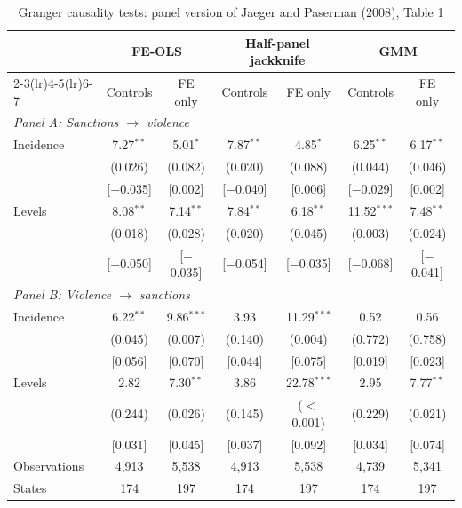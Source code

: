 \begin{table}[htbp]
\centering
\footnotesize
\caption{Granger causality tests: panel version of Jaeger and Paserman (2008), Table 1}
\label{tab:granger}
\begin{threeparttable}
\begin{tabular}{lcccccc}
\toprule
 & \multicolumn{2}{c}{FE-OLS} & \multicolumn{2}{c}{Half-panel jackknife} & \multicolumn{2}{c}{GMM} \\
\cmidrule(lr){2-3}\cmidrule(lr){4-5}\cmidrule(lr){6-7}
 & Controls & FE only & Controls & FE only & Controls & FE only \\
\midrule
\multicolumn{7}{l}{\textit{Panel A: Sanctions $\rightarrow$ violence}} \\
\quad Incidence & 7.27$^{**}$ & 5.01$^{*}$ & 7.87$^{**}$ & 4.85$^{*}$ & 6.25$^{**}$ & 6.17$^{**}$ \\
\quad  & (0.026) & (0.082) & (0.020) & (0.088) & (0.044) & (0.046) \\
\quad  & [$-$0.035] & [0.002] & [$-$0.040] & [0.006] & [$-$0.029] & [0.002] \\
\quad Levels & 8.08$^{**}$ & 7.14$^{**}$ & 7.84$^{**}$ & 6.18$^{**}$ & 11.52$^{***}$ & 7.48$^{**}$ \\
\quad  & (0.018) & (0.028) & (0.020) & (0.045) & (0.003) & (0.024) \\
\quad  & [$-$0.050] & [$-$0.035] & [$-$0.054] & [$-$0.035] & [$-$0.068] & [$-$0.041] \\
\midrule
\multicolumn{7}{l}{\textit{Panel B: Violence $\rightarrow$ sanctions}} \\
\quad Incidence & 6.22$^{**}$ & 9.86$^{***}$ & 3.93 & 11.29$^{***}$ & 0.52 & 0.56 \\
\quad  & (0.045) & (0.007) & (0.140) & (0.004) & (0.772) & (0.758) \\
\quad  & [0.056] & [0.070] & [0.044] & [0.075] & [0.019] & [0.023] \\
\quad Levels & 2.82 & 7.30$^{**}$ & 3.86 & 22.78$^{***}$ & 2.95 & 7.77$^{**}$ \\
\quad  & (0.244) & (0.026) & (0.145) & ($<$0.001) & (0.229) & (0.021) \\
\quad  & [0.031] & [0.045] & [0.037] & [0.092] & [0.034] & [0.074] \\
\midrule
Observations & 4,913 & 5,538 & 4,913 & 5,538 & 4,739 & 5,341 \\
States & 174 & 197 & 174 & 197 & 174 & 197 \\
\bottomrule
\end{tabular}
\begin{tablenotes}[flushleft]\footnotesize

\end{tablenotes}
\end{threeparttable}
\end{table}
